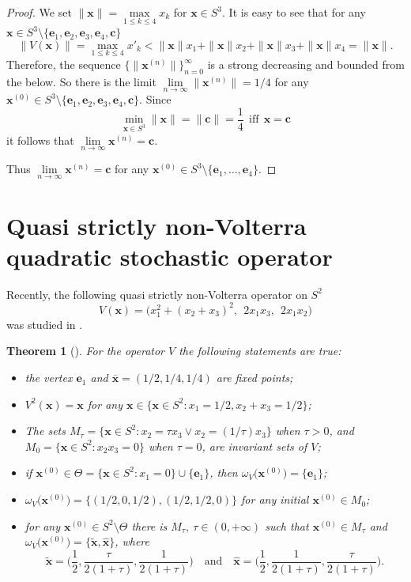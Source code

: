 \documentclass[11pt,reqno]{amsart}
\newtheorem{theorem}[subsection]{Theorem}
\numberwithin{equation}{section} \setcounter{tocdepth}{1}
\begin{document}
\begin{proof}
We set $\|\mathbf{x}\|=\max\limits_{1\leq k\leq 4} x_k $ for $\mathbf{x}\in S^3$.
It is easy to see that for any $\mathbf{x}\in S^3\setminus \{\mathbf{e}_1,\mathbf{e}_2,\mathbf{e}_3,\mathbf{e}_4, \mathbf{c}  \}$
\[\|V(\mathbf{x})\|=\max\limits_{1\leq k\leq 4} x'_k < \|\mathbf{x}\| x_1+
\|\mathbf{x}\| x_2+\|\mathbf{x}\| x_3+\|\mathbf{x}\| x_4= \|\mathbf{x}\|.\]
Therefore, the sequence  $\{\|\mathbf{x}^{(n)}\|\}_{n=0}^\infty$ is a strong decreasing and bounded from the below.
So there is the limit $\lim\limits_{n\rightarrow\infty} \|\mathbf{x}^{(n)}\| =1/4$  for any $\mathbf{x}^{(0)}\in S^3\setminus \{\mathbf{e}_1,\mathbf{e}_2,\mathbf{e}_3,\mathbf{e}_4,\mathbf{c}\}$.
Since
\[ \min\limits_{\mathbf{x}\in S^3} \|\mathbf{x}\| = \|\mathbf{c}\|=\frac{1}{4} \ \ \text{iff} \ \ \mathbf{x}=\mathbf{c}\]
it follows that  $\lim\limits_{n\rightarrow\infty} \mathbf{x}^{(n)} =\mathbf{c}$.

Thus $\lim\limits_{n\rightarrow\infty}\mathbf{x}^{(n)}=\mathbf{c}$ for any $\mathbf{x}^{(0)}\in S^3\setminus \{\mathbf{e}_1,\dots,\mathbf{e}_4\}$.
\end{proof}


\section{Quasi strictly non-Volterra quadratic stochastic operator}
\label{sec:periodicoperator}

Recently,  the following quasi strictly non-Volterra operator on $S^2$
\[V(\mathbf{x}) = \big(x^2_1+ (x_2+x_3)^2, \ \  2x_1x_3, \ \  2x_1x_2 \big)\]
was studied in \cite{Khukr}.

\begin{theorem}[\cite{Khukr}]  For the operator $V$ the following statements are true:
\begin{itemize}
\item[i)] the vertex $\mathbf{e}_1$ and  $\overline{\mathbf{x}}=(1/2,1/4,1/4)$ are fixed points;
\item[ii)] $V^2(\mathbf{x})=\mathbf{x}$ for any $\mathbf{x}\in \{\mathbf{x}\in S^2: x_1=1/2, x_2+x_3=1/2\}$;
\item[iii)] The sets $ M_\tau=\{\mathbf{x}\in S^2: x_2=\tau x_3 \vee x_2=(1/\tau) x_3 \} $ when $\tau>0$, and
  $ M_0=\{\mathbf{x}\in S^2: x_2x_3=0 \} $  when $\tau=0$, are invariant sets of $V$;
\item[iv)] if  $\mathbf{x}^{(0)}\in \Theta=\{\mathbf{x}\in S^2: x_1=0\}\cup\{\mathbf{e}_1\}$, then $\omega_{V} \big(\mathbf{x}^{(0)}\big)=\{\mathbf{e}_1\}$;
\item[v)]  $\omega_{V} \big(\mathbf{x}^{(0)}\big)=\{(1/2,0,1/2), (1/2,1/2,0)\}$ for any initial $\mathbf{x}^{(0)}\in M_0$;
\item[vi)] for any $\mathbf{x}^{(0)}\in S^2 \setminus\Theta$ there is $M_\tau,  \ \tau\in(0,+\infty)$ such that $\mathbf{x}^{(0)}\in M_\tau$ and $\omega_{V} \big(\mathbf{x}^{(0)}\big)=\{\tilde{\mathbf{x}},\hat{\mathbf{x}}\}$, where
    \[\tilde{\mathbf{x}}=\Big(\frac{1}{2},\frac{\tau}{2(1+\tau)},\frac{1}{2(1+\tau)} \Big) \quad \text{and} \quad  \hat{\mathbf{x}}=\Big(\frac{1}{2},\frac{1}{2(1+\tau)},\frac{\tau}{2(1+\tau)} \Big).\]
\end{itemize}
\end{theorem}
\end{document}
